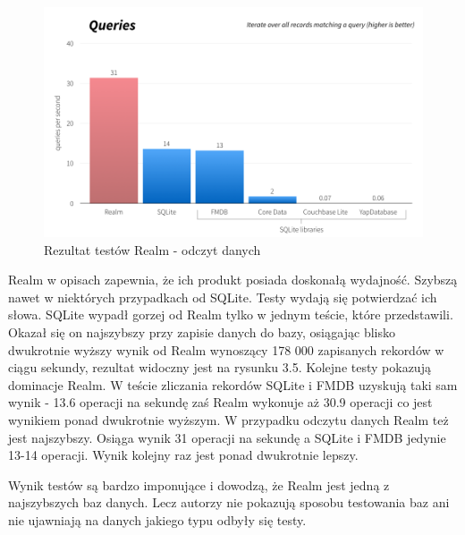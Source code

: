 \begin{figure}
\centering
	\includegraphics[width=\linewidth]{img/realm_query_test.png}
	\caption{Rezultat testów Realm - odczyt danych}
	\label{fig: realm_query_test}
\end{figure}
\clearpage

Realm w opisach zapewnia, że ich produkt posiada doskonałą wydajność. Szybszą nawet w niektórych przypadkach od SQLite. Testy wydają się potwierdzać ich słowa. SQLite wypadł gorzej od Realm tylko w jednym teście, które przedstawili. Okazał się on najszybszy przy zapisie danych do bazy, osiągając blisko dwukrotnie wyższy wynik od Realm wynoszący 178 000 zapisanych rekordów w ciągu sekundy, rezultat widoczny jest na rysunku 3.5. Kolejne testy pokazują dominacje Realm. W teście zliczania rekordów SQLite i FMDB uzyskują taki sam wynik - 13.6 operacji na sekundę zaś Realm wykonuje aż 30.9 operacji co jest wynikiem ponad dwukrotnie wyższym. W przypadku odczytu danych Realm też jest najszybszy. Osiąga wynik 31 operacji na sekundę a SQLite i FMDB jedynie 13-14 operacji. Wynik kolejny raz jest ponad dwukrotnie lepszy. \par 
Wynik testów są bardzo imponujące i dowodzą, że Realm jest jedną z najszybszych baz danych. Lecz autorzy nie pokazują sposobu testowania baz ani nie ujawniają na danych jakiego typu odbyły się testy. 